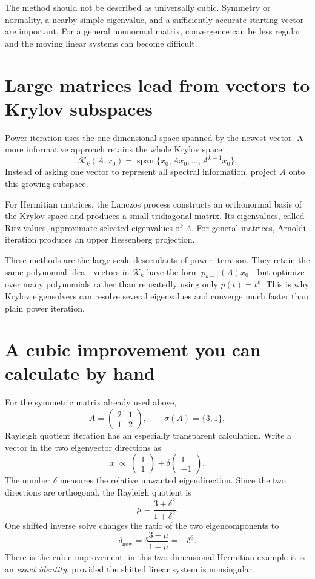 The method should not be described as universally cubic.  Symmetry or normality, a nearby simple eigenvalue, and a sufficiently accurate starting vector are important.  For a general nonnormal matrix, convergence can be less regular and the moving linear systems can become difficult.

\section{Large matrices lead from vectors to Krylov subspaces}

Power iteration uses the one-dimensional space spanned by the newest vector.  A more informative approach retains the whole Krylov space
\[
  \mathcal K_k(A,x_0)
  =\operatorname{span}
  \{x_0,Ax_0,\ldots,A^{k-1}x_0\}.
\]
Instead of asking one vector to represent all spectral information, project \(A\) onto this growing subspace.

For Hermitian matrices, the Lanczos process constructs an orthonormal basis of the Krylov space and produces a small tridiagonal matrix.  Its eigenvalues, called Ritz values, approximate selected eigenvalues of \(A\).  For general matrices, Arnoldi iteration produces an upper Hessenberg projection.

These methods are the large-scale descendants of power iteration.  They retain the same polynomial idea---vectors in \(\mathcal K_k\) have the form \(p_{k-1}(A)x_0\)---but optimize over many polynomials rather than repeatedly using only \(p(t)=t^k\).  This is why Krylov eigensolvers can resolve several eigenvalues and converge much faster than plain power iteration.

\section{A cubic improvement you can calculate by hand}

For the symmetric matrix already used above,
\[
 A=\begin{pmatrix}2&1\\1&2\end{pmatrix},
 \qquad \sigma(A)=\{3,1\},
\]
Rayleigh quotient iteration has an especially transparent calculation. Write a vector in the two eigenvector directions as
\[
 x\ \propto\
 \begin{pmatrix}1\\1\end{pmatrix}
 +\delta\begin{pmatrix}1\\-1\end{pmatrix}.
\]
The number $\delta$ measures the relative unwanted eigendirection. Since the two directions are orthogonal, the Rayleigh quotient is
\[
 \mu=\frac{3+\delta^2}{1+\delta^2}.
\]
One shifted inverse solve changes the ratio of the two eigencomponents to
\[
 \delta_{\mathrm{new}}
   =\delta\frac{3-\mu}{1-\mu}
   =\boxed{-\delta^3}.
\]
There is the cubic improvement: in this two-dimensional Hermitian example it is an \emph{exact identity}, provided the shifted linear system is nonsingular.

